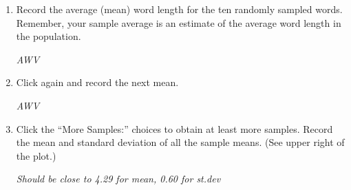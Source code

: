 \begin{enumerate}
\begin{enumerate}
 Click on  because we are dealing with one
 quantitative variable -- word length -- and drop down to
 .
     

   \item   The joke text should appear in the gray box. You can drag
     across this text and delete it if you want to paste other text
     into the box, but leave it there now.\\
       Click .  You
       should see a plot of all word lengths with summary
       information.  This is our population of 242 words.
     \item  Set  to  and click .   Write out the 10 words and their lengths.  
\begin{students}
  \vspace{2cm}
\end{students}    
\begin{key}
   {\it AWV }
\end{key}      
    \end{enumerate}
     \item  Record the average (mean) word length for the ten
       randomly sampled words. Remember, your sample average is an
       estimate of the average word length in the population.  
\begin{students}
  \vspace{1cm}
\end{students}    
\begin{key}
   {\it AWV}
\end{key}

     \item  Click   again and record the next mean.
\begin{students}
  \vspace{1cm}
\end{students}    
\begin{key}
   {\it AWV}
\end{key}
       

     \item  Click the ``More Samples:'' choices to
       obtain at least  more samples. Record the mean and
       standard deviation of all 
       the  sample means. (See upper right of the plot.)       
\begin{students}
  \vspace{1cm}
\end{students}    
\begin{key}
   {\it Should be close to 4.29 for mean, 0.60 for st.dev }
\end{key}
         


\end{enumerate}
